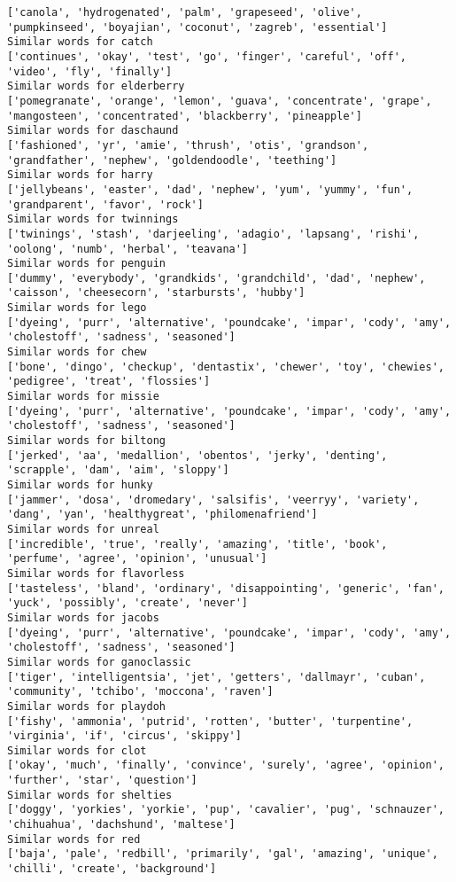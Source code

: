 \documentclass[11pt]{article}
\begin{document}
\begin{Verbatim}[commandchars=\\\{\}]
['canola', 'hydrogenated', 'palm', 'grapeseed', 'olive', 'pumpkinseed', 'boyajian', 'coconut', 'zagreb', 'essential']
Similar words for catch
['continues', 'okay', 'test', 'go', 'finger', 'careful', 'off', 'video', 'fly', 'finally']
Similar words for elderberry
['pomegranate', 'orange', 'lemon', 'guava', 'concentrate', 'grape', 'mangosteen', 'concentrated', 'blackberry', 'pineapple']
Similar words for daschaund
['fashioned', 'yr', 'amie', 'thrush', 'otis', 'grandson', 'grandfather', 'nephew', 'goldendoodle', 'teething']
Similar words for harry
['jellybeans', 'easter', 'dad', 'nephew', 'yum', 'yummy', 'fun', 'grandparent', 'favor', 'rock']
Similar words for twinnings
['twinings', 'stash', 'darjeeling', 'adagio', 'lapsang', 'rishi', 'oolong', 'numb', 'herbal', 'teavana']
Similar words for penguin
['dummy', 'everybody', 'grandkids', 'grandchild', 'dad', 'nephew', 'caisson', 'cheesecorn', 'starbursts', 'hubby']
Similar words for lego
['dyeing', 'purr', 'alternative', 'poundcake', 'impar', 'cody', 'amy', 'cholestoff', 'sadness', 'seasoned']
Similar words for chew
['bone', 'dingo', 'checkup', 'dentastix', 'chewer', 'toy', 'chewies', 'pedigree', 'treat', 'flossies']
Similar words for missie
['dyeing', 'purr', 'alternative', 'poundcake', 'impar', 'cody', 'amy', 'cholestoff', 'sadness', 'seasoned']
Similar words for biltong
['jerked', 'aa', 'medallion', 'obentos', 'jerky', 'denting', 'scrapple', 'dam', 'aim', 'sloppy']
Similar words for hunky
['jammer', 'dosa', 'dromedary', 'salsifis', 'veerryy', 'variety', 'dang', 'yan', 'healthygreat', 'philomenafriend']
Similar words for unreal
['incredible', 'true', 'really', 'amazing', 'title', 'book', 'perfume', 'agree', 'opinion', 'unusual']
Similar words for flavorless
['tasteless', 'bland', 'ordinary', 'disappointing', 'generic', 'fan', 'yuck', 'possibly', 'create', 'never']
Similar words for jacobs
['dyeing', 'purr', 'alternative', 'poundcake', 'impar', 'cody', 'amy', 'cholestoff', 'sadness', 'seasoned']
Similar words for ganoclassic
['tiger', 'intelligentsia', 'jet', 'getters', 'dallmayr', 'cuban', 'community', 'tchibo', 'moccona', 'raven']
Similar words for playdoh
['fishy', 'ammonia', 'putrid', 'rotten', 'butter', 'turpentine', 'virginia', 'if', 'circus', 'skippy']
Similar words for clot
['okay', 'much', 'finally', 'convince', 'surely', 'agree', 'opinion', 'further', 'star', 'question']
Similar words for shelties
['doggy', 'yorkies', 'yorkie', 'pup', 'cavalier', 'pug', 'schnauzer', 'chihuahua', 'dachshund', 'maltese']
Similar words for red
['baja', 'pale', 'redbill', 'primarily', 'gal', 'amazing', 'unique', 'chilli', 'create', 'background']

\end{Verbatim}
\end{document}
